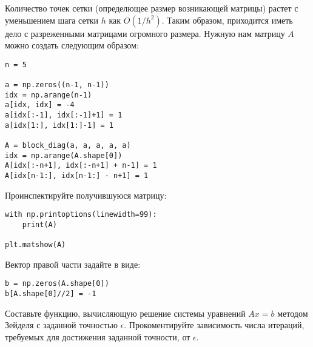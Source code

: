 \documentclass[prb,papersize=a4paper,notitlepage]{revtex4-1}%
\begin{document}
\begin{enumerate}
Количество точек сетки (определющее размер возникающей матрицы) растет с уменьшением шага сетки $h$ как $O(1/h^2)$. Таким образом, приходится иметь дело с разреженными матрицами огромного размера. Нужную нам матрицу $A$ можно создать следующим образом:
\lstset{language=Python}
\lstset{frame=lines}
\lstset{basicstyle=\ttfamily}
\begin{lstlisting}
n = 5

a = np.zeros((n-1, n-1))
idx = np.arange(n-1)
a[idx, idx] = -4
a[idx[:-1], idx[:-1]+1] = 1
a[idx[1:], idx[1:]-1] = 1

A = block_diag(a, a, a, a, a)
idx = np.arange(A.shape[0])
A[idx[:-n+1], idx[:-n+1] + n-1] = 1
A[idx[n-1:], idx[n-1:] - n+1] = 1
\end{lstlisting}

Проинспектируйте получившуюся матрицу:
\lstset{language=Python}
\lstset{frame=lines}
\lstset{basicstyle=\ttfamily}
\begin{lstlisting}
with np.printoptions(linewidth=99):
    print(A)

plt.matshow(A)
\end{lstlisting}

Вектор правой части задайте в виде:
\lstset{language=Python}
\lstset{frame=lines}
\lstset{basicstyle=\ttfamily}
\begin{lstlisting}
b = np.zeros(A.shape[0])
b[A.shape[0]//2] = -1
\end{lstlisting}

Составьте функцию, вычисляющую решение системы уравнений $A x = b$ методом Зейделя с заданной точностью $\epsilon$. Прокоментируйте зависимость числа итераций, требуемых для достижения заданной точности, от $\epsilon$.

\end{enumerate} 
\end{document}
